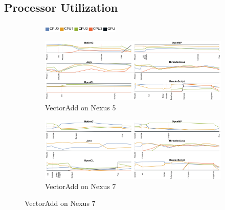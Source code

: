 \subsection{Processor Utilization}


\begin{figure}[htp]
  \centering

  \begin{subfigure}[b]{\textwidth}
          \centering
          \includegraphics[width=0.4\textwidth]{data/load_legend.pdf}
  \end{subfigure}

  \begin{subfigure}[b]{0.85\textwidth}
       \centering
       \includegraphics[width=\textwidth]{data/load_vectoradd_nexus5.pdf}
       \caption{VectorAdd on Nexus 5}\label{fig:Vecadd5}
   \end{subfigure}
  \begin{subfigure}[b]{0.85\textwidth}
       \centering
       \includegraphics[width=\textwidth]{data/load_vectoradd_nexus7.pdf}
       \caption{VectorAdd on Nexus 7}\label{fig:Vecadd7}
   \end{subfigure}


\end{figure}
